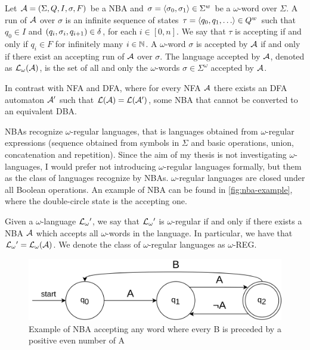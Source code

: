 \begin{definition}
Let $\mathcal{A} = \left( \Sigma,Q,I,\sigma,F \right)$ be a NBA and $\sigma = \left\langle \sigma_0,\sigma_1 \right\rangle \in \Sigma^{w}$ be a $\omega$-word over $\Sigma$.
A run of $\mathcal{A}$ over $\sigma$ is an infinite sequence of states $\tau = \sequence{q_0,q_1,\dots} \in Q^w$ such that $q_0 \in I$ and $\left( q_i,\sigma_i,q_{i+1} \right) \in \delta$, for each $i \in [0,n]$.
We say that $\tau$ is accepting if and only if $q_i \in F$ for infinitely many $i \in \mathbb{N}$.
A $\omega$-word $\sigma$ is accepted by $\mathcal{A}$ if and only if there exist an accepting run of $\mathcal{A}$ over $\sigma$. 
The language accepted by $\mathcal{A}$, denoted as $\mathcal{L}{}_\omega{(\mathcal{A})}$, is the set of all and only the $\omega$-words $\sigma \in \Sigma^\omega$ accepted by $\mathcal{A}$.
\end{definition}

In contrast with NFA and DFA, where for every NFA $\mathcal{A}$ there exists an DFA automaton $\mathcal{A}'$ such that $\mathcal{L}{(\mathcal{A})} = \mathcal{L}{(\mathcal{A}')}$, some NBA that cannot be converted to an equivalent DBA.

NBAs recognize $\omega$-regular languages, that is languages obtained from $\omega$-regular expressions (sequence obtained from symbols in $\Sigma$ and basic operations, union, concatenation and repetition). Since the aim of my thesis is not investigating $\omega$-languages, I would prefer not introducing $\omega$-regular languages formally, but them as the class of languages recognize by NBAs. $\omega$-regular languages are closed under all Boolean operations. 
An example of NBA can be found in \autoref{fig:nba-example}, where the double-circle state is the accepting one.

\begin{theorem}
Given a $\omega$-language $\mathcal{L}{}_\omega{}'$, we say that $\mathcal{L}{}_\omega{}'$ is $\omega$-regular if and only if there exists a NBA $\mathcal{A}$ which accepts all $\omega$-words in the language.
In particular, we have that $\mathcal{L}{}_\omega{}' = \mathcal{L}{}_\omega{(\mathcal{A})}$.
We denote the class of $\omega$-regular languages as $\omega$-REG.
\end{theorem}

\begin{figure}[!htp]
    \centering
    \includegraphics[width=0.8\linewidth]{figures/nba-example.png}
    \caption{Example of NBA accepting any word where every B is preceded by a positive even number of A}
    \label{fig:nba-example}
\end{figure}


